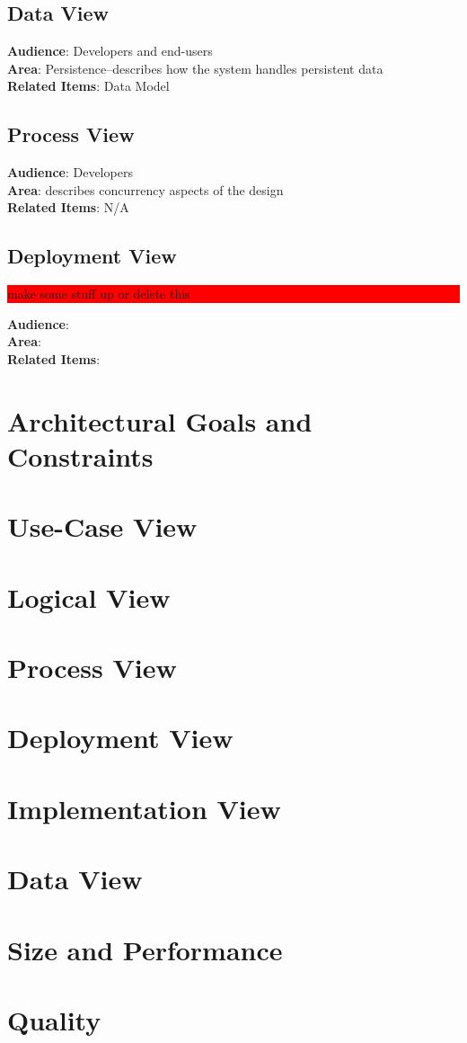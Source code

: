 \documentclass{article}
\newcommand{\todo}[1]{\colorbox{red}{\begin{minipage}{\textwidth}{#1}\end{minipage}}}
\begin{document}
\subsection{Data View}
\textbf{Audience}: Developers and end-users\\
\textbf{Area}: Persistence--describes how the system handles persistent data\\
\textbf{Related Items}: Data Model
\subsection{Process View}
\textbf{Audience}: Developers\\
\textbf{Area}: describes concurrency aspects of the design\\
\textbf{Related Items}: N/A
\subsection{Deployment View}
\todo{make some stuff up or delete this}
\textbf{Audience}:\\
\textbf{Area}:\\
\textbf{Related Items}:

\section{Architectural Goals and Constraints}

\section{Use-Case View}

\section{Logical View}

\section{Process View}

\section{Deployment View}

\section{Implementation View}

\section{Data View}

\section{Size and Performance}

\section{Quality}
\end{document}
